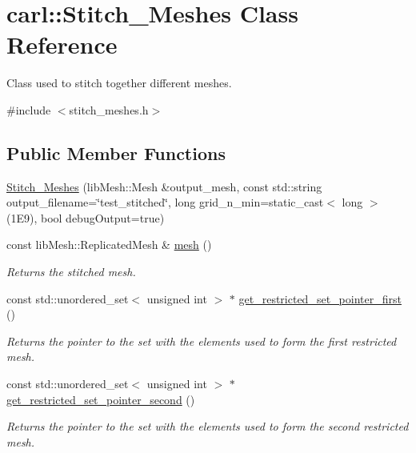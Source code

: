 \hypertarget{classcarl_1_1_stitch___meshes}{}\section{carl\+:\+:Stitch\+\_\+\+Meshes Class Reference}
\label{classcarl_1_1_stitch___meshes}


Class used to stitch together different meshes.  




{\ttfamily \#include $<$stitch\+\_\+meshes.\+h$>$}

\subsection*{Public Member Functions}
\begin{DoxyCompactItemize}
\item 
\hyperlink{classcarl_1_1_stitch___meshes_ae978446cc891d6d04763836e132e5bd7}{Stitch\+\_\+\+Meshes} (lib\+Mesh\+::\+Mesh \&output\+\_\+mesh, const std\+::string output\+\_\+filename=\char`\"{}test\+\_\+stitched\char`\"{}, long grid\+\_\+n\+\_\+min=static\+\_\+cast$<$ long $>$(1\+E9), bool debug\+Output=true)
\item 
const lib\+Mesh\+::\+Replicated\+Mesh \& \hyperlink{classcarl_1_1_stitch___meshes_afbd765e623bdfe38f82771db8a997098}{mesh} ()
\begin{DoxyCompactList}\small\item\em Returns the stitched mesh. \end{DoxyCompactList}\item 
const std\+::unordered\+\_\+set$<$ unsigned int $>$ $\ast$ \hyperlink{classcarl_1_1_stitch___meshes_a22047d64fc5364a4bf773cce493c30f0}{get\+\_\+restricted\+\_\+set\+\_\+pointer\+\_\+first} ()
\begin{DoxyCompactList}\small\item\em Returns the pointer to the set with the elements used to form the first restricted mesh. \end{DoxyCompactList}\item 
const std\+::unordered\+\_\+set$<$ unsigned int $>$ $\ast$ \hyperlink{classcarl_1_1_stitch___meshes_af89b784dc971bc73abefaad8fadbe59c}{get\+\_\+restricted\+\_\+set\+\_\+pointer\+\_\+second} ()
\begin{DoxyCompactList}\small\item\em Returns the pointer to the set with the elements used to form the second restricted mesh. \end{DoxyCompactList}\item 

\end{DoxyCompactItemize}
